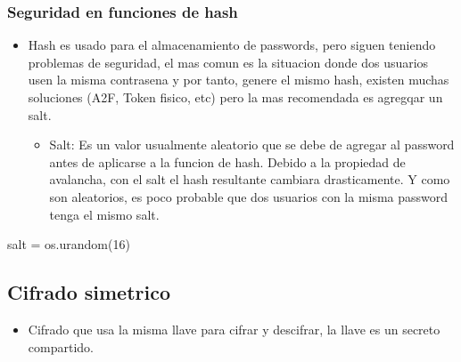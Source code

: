 \documentclass[11pt]{article}
\begin{document}
\subsubsection{Seguridad en funciones de hash}
\label{sec:org48c623b}
\begin{itemize}
\item Hash es usado para el almacenamiento de passwords, pero siguen teniendo problemas de seguridad, el mas comun es la situacion donde dos usuarios usen la misma contrasena y por tanto, genere el mismo hash, existen muchas soluciones (A2F, Token fisico, etc) pero la mas recomendada es agregqar un salt.

\begin{itemize}
\item Salt: Es un valor usualmente aleatorio que se debe de agregar al password antes de aplicarse a la funcion de hash. Debido a la propiedad de avalancha, con el salt el hash resultante cambiara drasticamente. Y como son aleatorios, es poco probable que dos usuarios con la misma password tenga el mismo salt.
\end{itemize}
\end{itemize}

salt = os.urandom(16)
\subsection{Cifrado simetrico}
\label{sec:orgf87ab2a}
\begin{itemize}
\item Cifrado que usa la misma llave para cifrar y descifrar, la llave es un secreto compartido.
\end{itemize}
\end{document}
